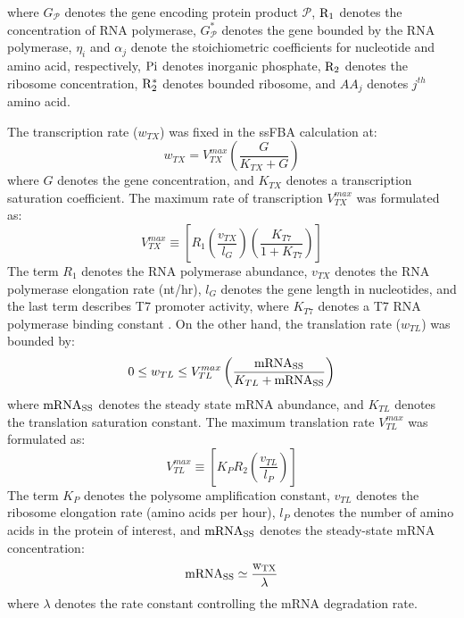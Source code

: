 \documentclass[12pt]{article}
\begin{document}
where $G_{\mathcal{P}}$ denotes the gene encoding protein product $\mathcal{P}$,
$\rm R_{1}$ denotes the concentration of RNA polymerase,
$G_{\mathcal{P}}^{*}$ denotes the gene bounded by the RNA polymerase,
$\eta_{i}$ and $ \alpha_{j}$ denote the stoichiometric coefficients for nucleotide and amino acid, respectively,
$\rm Pi$ denotes inorganic phosphate,
$\rm R_{2}$ denotes the ribosome concentration,
$\rm R_{2}^{*}$ denotes bounded ribosome,
and $AA_{j}$ denotes $j^{th}$ amino acid.

The transcription rate ($w_{TX}$) was fixed in the ssFBA calculation at:
\begin{equation}
	w_{TX} = V_{TX}^{max}\left(\frac{G}{K_{TX}+G}\right)
\end{equation}
where $G$ denotes the gene concentration, and $K_{TX}$ denotes a transcription saturation coefficient.
The maximum rate of transcription $V_{TX}^{max}$ was formulated as:
\begin{equation}
	V_{TX}^{max} \equiv \left[R_{1}\left(\frac{v_{TX}}{l_{G}}\right)\left(\frac{K_{T7}}{1 + K_{T7}}\right)\right]
\end{equation}
The term $R_{1}$ denotes the RNA polymerase abundance,
$v_{TX}$ denotes the RNA polymerase elongation rate (nt/hr),
$l_{G}$ denotes the gene length in nucleotides, and the last term describes T7 promoter activity,
where $K_{T7}$ denotes a T7 RNA polymerase binding constant \cite{Moon:2012aa}.
On the other hand, the translation rate ($w_{TL}$) was bounded by:
 \begin{equation}
	0\leq w_{TL} \leq V_{TL}^{max}\left(\frac{\rm mRNA_{SS}}{K_{TL}+\rm mRNA_{SS}}\right)
\end{equation}
where $\rm mRNA_{SS}$ denotes the steady state mRNA abundance, and $K_{TL}$ denotes the translation saturation constant.
The maximum translation rate $V_{TL}^{max}$ was formulated as:
\begin{equation}
	V_{TL}^{max} \equiv \left[K_{P} R_{2}\left(\frac{v_{TL}}{l_{P}}\right)\right]
\end{equation}
The term $K_{P}$ denotes the polysome amplification constant,
$v_{TL}$ denotes the ribosome elongation rate (amino acids per hour),
$l_{P}$ denotes the number of amino acids in the protein of interest,
and $\rm mRNA_{SS}$ denotes the steady-state mRNA concentration:
\begin{equation}
	\rm mRNA_{SS}\simeq\frac{w_{TX}}{\lambda}
\end{equation}where $\lambda$ denotes the rate constant controlling the mRNA degradation rate.
\end{document}
